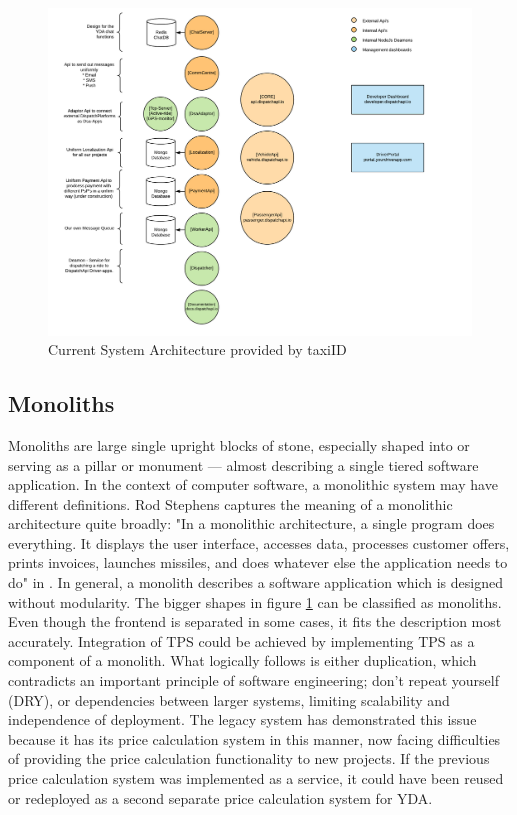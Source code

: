 
\begin{figure}[!htb]
	\centering
	\includegraphics[width=1\textwidth]{Architecture}
	\caption[Architecture]{Current System Architecture provided by taxiID}
	\label{fig:Architecture}
\end{figure}

\subsection{Monoliths}
Monoliths are large single upright blocks of stone, especially shaped into or serving as a pillar or monument --- almost describing a single tiered software application. In the context of computer software, a monolithic system may have different definitions. Rod Stephens captures the meaning of a monolithic architecture quite broadly: "In a monolithic architecture, a single program does everything. It displays the user interface, accesses data, processes customer offers, prints invoices, launches missiles, and does whatever else the application needs to do" in \cite{rod-BSE}. In general, a monolith describes a software application which is designed without modularity. The bigger shapes in figure \ref{fig:Architecture} can be classified as monoliths. Even though the frontend is separated in some cases, it fits the description most accurately. Integration of TPS could be achieved by implementing TPS as a component of a monolith. What logically follows is either duplication, which contradicts an important principle of software engineering; don't repeat yourself (DRY), or dependencies between larger systems, limiting scalability and independence of deployment. The legacy system has demonstrated this issue because it has its price calculation system in this manner, now facing difficulties of providing the price calculation functionality to new projects. If the previous price calculation system was implemented as a service, it could have been reused or redeployed as a second separate price calculation system for YDA.

